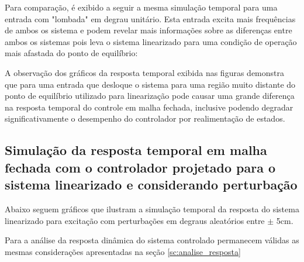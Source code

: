 Para comparação, é exibido a seguir a mesma simulação temporal para uma entrada com "lombada" em degrau unitário. Esta entrada excita mais frequências de ambos os sistema e podem revelar mais informações sobre as diferenças entre ambos os sistemas pois leva o sistema linearizado para uma condição de operação mais afastada do ponto de equilíbrio: 
    
A observação dos gráficos da resposta temporal exibida nas figuras demonstra que para uma entrada que desloque o sistema para uma região muito distante do ponto de equilíbrio utilizado para linearização pode causar uma grande diferença na resposta temporal do controle em malha fechada, inclusive podendo degradar significativamente o desempenho do controlador por realimentação de estados.  
        
\subsection{Simulação da resposta temporal em malha fechada com o controlador projetado para o sistema linearizado e considerando perturbação}
 
Abaixo seguem gráficos que ilustram a simulação temporal da resposta do sistema linearizado para excitação com perturbações em degraus aleatórios entre $\pm$ 5cm.

Para a análise da resposta dinâmica do sistema controlado permanecem válidas as mesmas considerações apresentadas na seção \ref{sc:analise_resposta}

